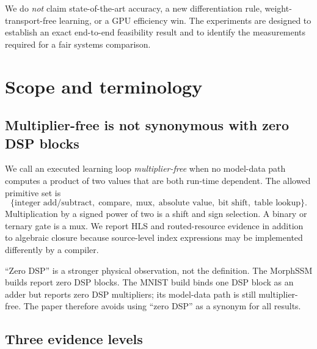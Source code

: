 \documentclass[10pt]{article}
\begin{document}
We do \emph{not} claim state-of-the-art accuracy, a new differentiation rule,
weight-transport-free learning, or a GPU efficiency win.  The experiments are
designed to establish an exact end-to-end feasibility result and to identify
the measurements required for a fair systems comparison.

\section{Scope and terminology}

\subsection{Multiplier-free is not synonymous with zero DSP blocks}

We call an executed learning loop \emph{multiplier-free} when no model-data
path computes a product of two values that are both run-time dependent.  The
allowed primitive set is
\[
  \{\text{integer add/subtract},\; \text{compare},\; \text{mux},\;
    \text{absolute value},\; \text{bit shift},\; \text{table lookup}\}.
\]
Multiplication by a signed power of two is a shift and sign selection.  A
binary or ternary gate is a mux.  We report HLS and routed-resource evidence in
addition to algebraic closure because source-level index expressions may be
implemented differently by a compiler.

``Zero DSP'' is a stronger physical observation, not the definition.  The
MorphSSM builds report zero DSP blocks.  The MNIST build binds one DSP block as
an adder but reports zero DSP multipliers; its model-data path is still
multiplier-free.  The paper therefore avoids using ``zero DSP'' as a synonym
for all results.

\subsection{Three evidence levels}
\end{document}
